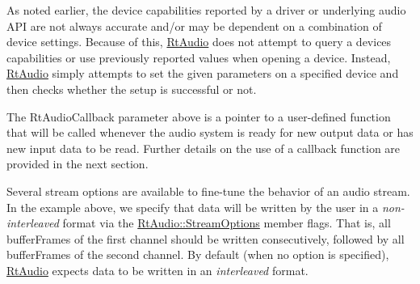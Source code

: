 As noted earlier, the device capabilities reported by a driver or underlying audio A\+PI are not always accurate and/or may be dependent on a combination of device settings. Because of this, \mbox{\hyperlink{class_rt_audio}{Rt\+Audio}} does not attempt to query a device\textquotesingle{}s capabilities or use previously reported values when opening a device. Instead, \mbox{\hyperlink{class_rt_audio}{Rt\+Audio}} simply attempts to set the given parameters on a specified device and then checks whether the setup is successful or not.

The Rt\+Audio\+Callback parameter above is a pointer to a user-\/defined function that will be called whenever the audio system is ready for new output data or has new input data to be read. Further details on the use of a callback function are provided in the next section.

Several stream options are available to fine-\/tune the behavior of an audio stream. In the example above, we specify that data will be written by the user in a {\itshape non-\/interleaved} format via the \mbox{\hyperlink{struct_rt_audio_1_1_stream_options}{Rt\+Audio\+::\+Stream\+Options}} member {\ttfamily flags}. That is, all {\ttfamily buffer\+Frames} of the first channel should be written consecutively, followed by all {\ttfamily buffer\+Frames} of the second channel. By default (when no option is specified), \mbox{\hyperlink{class_rt_audio}{Rt\+Audio}} expects data to be written in an {\itshape interleaved} format. 